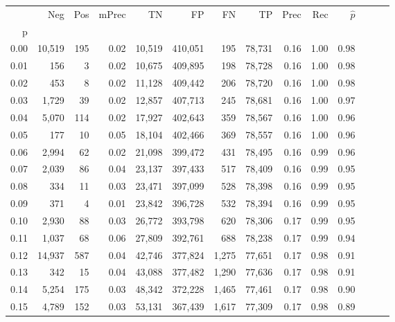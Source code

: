 \begin{tabular}{rrrrrrrrrrrrrr}
\toprule
{} &     Neg &    Pos & mPrec &       TN &       FP &      FN &      TP &  Prec &   Rec & $\hat{p}$ \\
p    &         &        &       &          &          &         &         &       &       &           \\
\midrule
0.00 &  10,519 &    195 &  0.02 &   10,519 &  410,051 &     195 &  78,731 &  0.16 &  1.00 &      0.98 \\
0.01 &     156 &      3 &  0.02 &   10,675 &  409,895 &     198 &  78,728 &  0.16 &  1.00 &      0.98 \\
0.02 &     453 &      8 &  0.02 &   11,128 &  409,442 &     206 &  78,720 &  0.16 &  1.00 &      0.98 \\
0.03 &   1,729 &     39 &  0.02 &   12,857 &  407,713 &     245 &  78,681 &  0.16 &  1.00 &      0.97 \\
0.04 &   5,070 &    114 &  0.02 &   17,927 &  402,643 &     359 &  78,567 &  0.16 &  1.00 &      0.96 \\
0.05 &     177 &     10 &  0.05 &   18,104 &  402,466 &     369 &  78,557 &  0.16 &  1.00 &      0.96 \\
0.06 &   2,994 &     62 &  0.02 &   21,098 &  399,472 &     431 &  78,495 &  0.16 &  0.99 &      0.96 \\
0.07 &   2,039 &     86 &  0.04 &   23,137 &  397,433 &     517 &  78,409 &  0.16 &  0.99 &      0.95 \\
0.08 &     334 &     11 &  0.03 &   23,471 &  397,099 &     528 &  78,398 &  0.16 &  0.99 &      0.95 \\
0.09 &     371 &      4 &  0.01 &   23,842 &  396,728 &     532 &  78,394 &  0.16 &  0.99 &      0.95 \\
0.10 &   2,930 &     88 &  0.03 &   26,772 &  393,798 &     620 &  78,306 &  0.17 &  0.99 &      0.95 \\
0.11 &   1,037 &     68 &  0.06 &   27,809 &  392,761 &     688 &  78,238 &  0.17 &  0.99 &      0.94 \\
0.12 &  14,937 &    587 &  0.04 &   42,746 &  377,824 &   1,275 &  77,651 &  0.17 &  0.98 &      0.91 \\
0.13 &     342 &     15 &  0.04 &   43,088 &  377,482 &   1,290 &  77,636 &  0.17 &  0.98 &      0.91 \\
0.14 &   5,254 &    175 &  0.03 &   48,342 &  372,228 &   1,465 &  77,461 &  0.17 &  0.98 &      0.90 \\
0.15 &   4,789 &    152 &  0.03 &   53,131 &  367,439 &   1,617 &  77,309 &  0.17 &  0.98 &      0.89 \\

\end{tabular}
